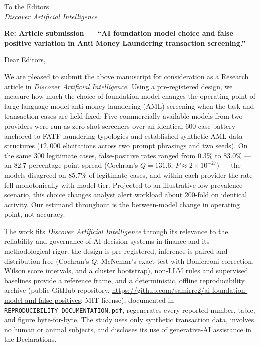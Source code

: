 \documentclass[12pt]{article}
\begin{document}
\noindent To the Editors\\
\emph{Discover Artificial Intelligence}

\vspace{6pt}
\noindent\textbf{Re: Article submission --- ``AI foundation model choice and false positive variation in Anti Money Laundering transaction screening.''}

\vspace{6pt}
\noindent Dear Editors,

We are pleased to submit the above manuscript for consideration as a Research article in \emph{Discover Artificial Intelligence}. Using a pre-registered design, we measure how much the choice of foundation model changes the operating point of large-language-model anti-money-laundering (AML) screening when the task and transaction cases are held fixed. Five commercially available models from two providers were run as zero-shot screeners over an identical 600-case battery anchored to FATF laundering typologies and established synthetic-AML data structures ($12{,}000$ elicitations across two prompt phrasings and two seeds). On the same $300$ legitimate cases, false-positive rates ranged from $0.3\%$ to $83.0\%$ --- an $82.7$ percentage-point spread (Cochran's $Q=131.6$, $P\approx2\times10^{-27}$) --- the models disagreed on $85.7\%$ of legitimate cases, and within each provider the rate fell monotonically with model tier. Projected to an illustrative low-prevalence scenario, this choice changes analyst alert workload about $200$-fold on identical activity. Our estimand throughout is the between-model change in operating point, not accuracy.

The work fits \emph{Discover Artificial Intelligence} through its relevance to the reliability and governance of AI decision systems in finance and its methodological rigor: the design is pre-registered, inference is paired and distribution-free (Cochran's $Q$, McNemar's exact test with Bonferroni correction, Wilson score intervals, and a cluster bootstrap), non-LLM rules and supervised baselines provide a reference frame, and a deterministic, offline reproducibility archive (public GitHub repository, \url{https://github.com/samirrc2/ai-foundation-model-aml-false-positives}; MIT license), documented in \texttt{REPRODUCIBILITY\_DOCUMENTATION.pdf}, regenerates every reported number, table, and figure byte-for-byte. The study uses only synthetic transaction data, involves no human or animal subjects, and discloses its use of generative-AI assistance in the Declarations.
\end{document}
